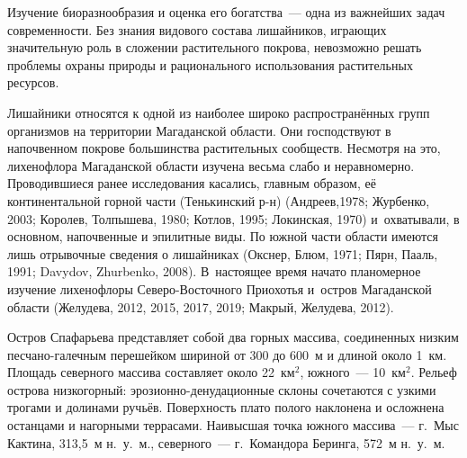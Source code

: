  

\makeProcTitleRazdel
{}

Изучение биоразнообразия и оценка его богатства~--- одна из важнейших задач современности. Без знания видового состава лишайников, играющих значительную роль в сложении растительного покрова, невозможно решать проблемы охраны природы и рационального использования растительных ресурсов.

Лишайники относятся к одной из наиболее широко распространённых групп организмов на территории Магаданской области. Они господствуют в напочвенном покрове большинства растительных сообществ. Несмотря на это, лихенофлора Магаданской области изучена весьма слабо и неравномерно. Проводившиеся ранее исследования касались, главным образом, её континентальной горной части (Тенькинский р-н) (Андреев,1978; Журбенко, 2003; Королев, Толпышева, 1980; Котлов, 1995;  Локинская, 1970) и~охватывали, в основном, напочвенные и эпилитные виды. По южной части области имеются лишь отрывочные сведения о лишайниках (Окснер, Блюм, 1971; Пярн, Пааль, 1991; Davydov, Zhurbenko, 2008). В~настоящее время начато планомерное изучение лихенофлоры Северо-Восточного Приохотья и~остров Магаданской области (Желудева, 2012, 2015, 2017, 2019; Макрый, Желудева, 2012).

Остров Спафарьева представляет собой два горных массива, соединенных низким песчано-галечным перешейком шириной от 300 до 600~м и длиной около 1~км. Площадь северного массива составляет около 22~км$^2$, южного~--- 10~км$^2$. Рельеф острова низкогорный: эрозионно-денудационные склоны сочетаются с узкими трогами и долинами ручьёв. Поверхность плато полого наклонена и осложнена останцами и нагорными террасами. Наивысшая точка южного массива~--- г.~Мыс Кактина, 313,5~м н.~у.~м., северного~--- г.~Командора Беринга, 572~м н.~у.~м.

